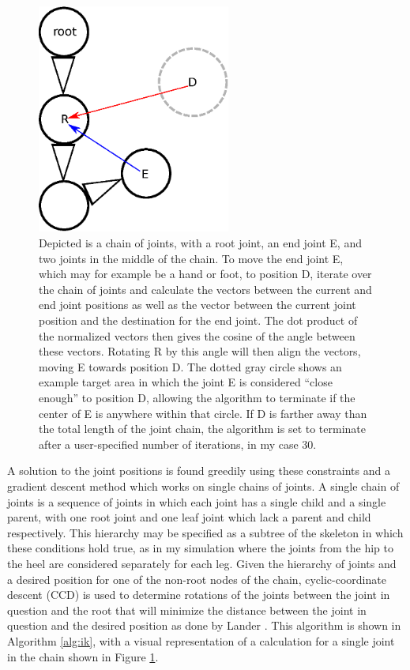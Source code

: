 
\begin{figure}[ht]
	\centering
	\includegraphics[width=2.5in]{images/ik/ccd.eps}
	\caption[Diagram of the process of CCD inverse kinematics solving]{Depicted is a chain of joints, with a root joint, an end joint E, and two joints in the middle of the chain.  To move the end joint E, which may for example be a hand or foot, to position D, iterate over the chain of joints and calculate the vectors between the current and end joint positions as well as the vector between the current joint position and the destination for the end joint.  The dot product of the normalized vectors then gives the cosine of the angle between these vectors.  Rotating R by this angle will then align the vectors, moving E towards position D.  The dotted gray circle shows an example target area in which the joint E is considered ``close enough'' to position D, allowing the algorithm to terminate if the center of E is anywhere within that circle.  If D is farther away than the total length of the joint chain, the algorithm is set to terminate after a user-specified number of iterations, in my case 30.}
	\label{fig:ccd}
\end{figure}

A solution to the joint positions is found greedily using these constraints and a gradient descent method which works on single chains of joints.  A single chain of joints is a sequence of joints in which each joint has a single child and a single parent, with one root joint and one leaf joint which lack a parent and child respectively.  This hierarchy may be specified as a subtree of the skeleton in which these conditions hold true, as in my simulation where the joints from the hip to the heel are considered separately for each leg.  Given the hierarchy of joints and a desired position for one of the non-root nodes of the chain, cyclic-coordinate descent (CCD) is used to determine rotations of the joints between the joint in question and the root that will minimize the distance between the joint in question and the desired position as done by Lander \cite{kine1, kine2}.  This algorithm is shown in Algorithm \ref{alg:ik}, with a visual representation of a calculation for a single joint in the chain shown in Figure \ref{fig:ccd}.

